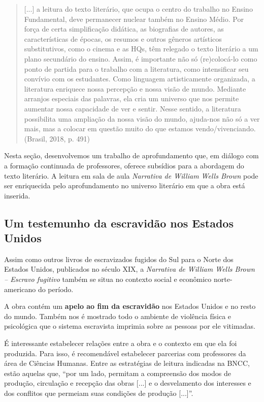 \documentclass[11pt]{extarticle}
\begin{document}
\begin{quote}
{[}...{]} a leitura do texto literário, que ocupa o centro do trabalho
no Ensino Fundamental, deve permanecer nuclear também no Ensino Médio.
Por força de certa simplificação didática, as biografias de autores, as
características de épocas, os resumos e outros gêneros artísticos
substitutivos, como o cinema e as HQs, têm relegado o texto literário a
um plano secundário do ensino. Assim, é importante não só (re)colocá-lo
como ponto de partida para o trabalho com a literatura, como
intensificar seu convívio com os estudantes. Como linguagem
artisticamente organizada, a literatura enriquece nossa percepção e
nossa visão de mundo. Mediante arranjos especiais das palavras, ela cria
um universo que nos permite aumentar nossa capacidade de ver e sentir.
Nesse sentido, a literatura possibilita uma ampliação da nossa visão do
mundo, ajuda-nos não só a ver mais, mas a colocar em questão muito do
que estamos vendo/vivenciando. (Brasil, 2018, p. 491)
\end{quote}

Nesta seção, desenvolvemos um trabalho de aprofundamento que, em diálogo
com a formação continuada de professores, oferece subsídios para a
abordagem do texto literário. A leitura em sala de aula \emph{Narrativa
de William Wells Brown} pode ser enriquecida pelo aprofundamento no
universo literário em que a obra está inserida.

\subsection{Um testemunho da escravidão nos Estados Unidos}

Assim como outros livros de escravizados fugidos do Sul para o Norte dos
Estados Unidos, publicados no século XIX, a \emph{Narrativa de William
Wells Brown -- Escravo fugitivo} também se situa no contexto social e
econômico norte-americano do período.

A obra contém um \textbf{apelo ao fim da escravidão} nos Estados Unidos
e no resto do mundo. Também nos é mostrado todo o ambiente de violência
física e psicológica que o sistema escravista imprimia sobre as pessoas
por ele vitimadas.

É interessante estabelecer relações entre a obra e o contexto em que ela
foi produzida. Para isso, é recomendável estabelecer parcerias com
professores da área de Ciências Humanas. Entre as estratégias de leitura
indicadas na BNCC, estão aquelas que, ``por um lado, permitam a
compreensão dos modos de produção, circulação e recepção das obras
{[}...{]} e o desvelamento dos interesses e dos conflitos que permeiam
suas condições de produção {[}...{]}''.
\end{document}
